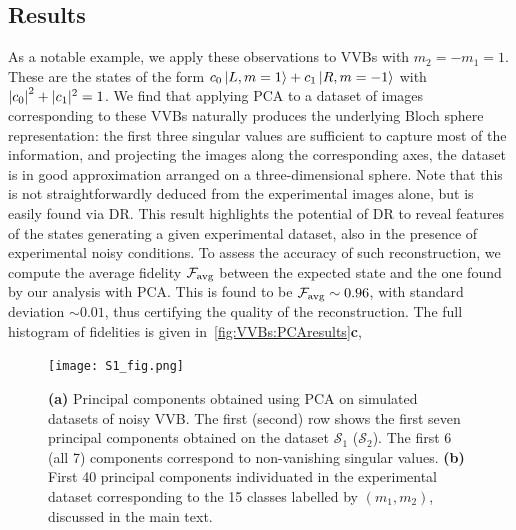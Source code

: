 \subsection{Results}

As a notable example, we apply these observations to VVBs with $m_2=-m_1=1$.
These are the states of the form $c_0 \ket{L,m=1} + c_1 \ket{R, m=-1}$ with $\abs{c_0}^2+|c_1|^2=1$.
We find that applying PCA to a dataset of images corresponding to these VVBs naturally produces the underlying Bloch sphere representation:
the first three singular values are sufficient to capture most of the information, and projecting the images along the corresponding axes, the dataset is in good approximation arranged on a three-dimensional sphere.
Note that this is not straightforwardly deduced from the experimental images alone, but is easily found via \ac{DR}.
This result highlights the potential of \ac{DR} to reveal features of the states generating a given experimental dataset, also in the presence of experimental noisy conditions.
To assess the accuracy of such reconstruction, we compute the average fidelity ${\mathcal{F}}_{\operatorname{avg}}$ between the expected state and the one found by our analysis with PCA.
This is found to be ${\mathcal{F}}_{\operatorname{avg}}\sim0.96$, with standard deviation $\sim0.01$, thus certifying the quality of the reconstruction.
The full histogram of fidelities is given in~\cref{fig:VVBs:PCAresults}\textbf{c}, 

\begin{figure}[tb]
  \centering
  \texttt{[image: S1\_fig.png]}
  \caption{
      \textbf{(a)}
       Principal components obtained using PCA on simulated datasets of noisy VVB. The first (second) row shows the first seven principal components obtained on the dataset $\mathcal S_1$ ($\mathcal S_2$). 
       The first 6 (all 7) components correspond to non-vanishing singular values.
       \textbf{(b)} First 40 principal components individuated in the experimental dataset corresponding to the 15 classes labelled by $(m_1,m_2)$, discussed in the main text.%
    }
    \label{fig:VVBs:principal_components}
\end{figure}

